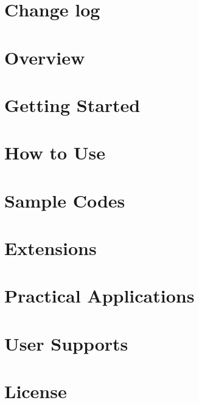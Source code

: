 \documentclass[12pt,a4paper]{article}
\title{\docTitle}
\author{Ataru Tanikawa}
\author{Daisuke Namekata}
\author{Natsuki Hosono}
\author{Masaki Iwasawa}
\author{Keigo Nitadori}
\author{Takayuki Munanushi}
\author{Junichiro Makino}
\affil{\affiliation}
\date{}
\begin{document}
\maketitle
\tableofcontents

\newpage


\section{Change log}
\label{sec:change_log}

\clearpage

\section{Overview}
\label{sec:overview}

\clearpage

\section{Getting Started}
\label{sec:getting_started}

\newpage

\section{How to Use}
\label{sec:how_to_use}

\clearpage

\section{Sample Codes}
\label{sec:sample_codes}

\clearpage

\section{Extensions}
\label{sec:extensions}

\clearpage

\section{Practical Applications}
\label{sec:applications}

\clearpage

\section{User Supports}

\clearpage

\section{License}

\end{document}
